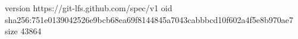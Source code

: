 version https://git-lfs.github.com/spec/v1
oid sha256:751e0139042526e9bcb68ea69f8144845a7043cabbbcd10f602a4f5e8b970ae7
size 43864
